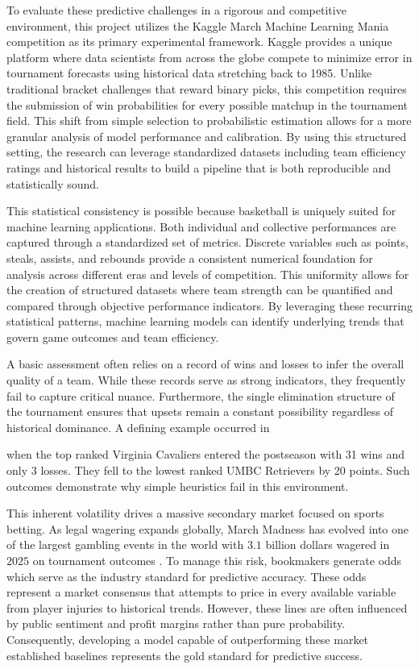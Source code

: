 \documentclass[12pt,leqno]{article}\usepackage[pdftex]{graphicx}\usepackage[usenames,dvipsnames]{xcolor}
\theoremstyle{remark}
\begin{document}
To evaluate these predictive challenges in a rigorous and competitive environment, this project utilizes the Kaggle March Machine Learning Mania competition as its primary experimental framework. Kaggle provides a unique platform where data scientists from across the globe compete to minimize error in tournament forecasts using historical data stretching back to 1985. Unlike traditional bracket challenges that reward binary picks, this competition requires the submission of win probabilities for every possible matchup in the tournament field. This shift from simple selection to probabilistic estimation allows for a more granular analysis of model performance and calibration. By using this structured setting, the research can leverage standardized datasets including team efficiency ratings and historical results to build a pipeline that is both reproducible and statistically sound.

This statistical consistency is possible because basketball is uniquely suited for machine learning applications. Both individual and collective performances are captured through a standardized set of metrics. Discrete variables such as points, steals, assists, and rebounds provide a consistent numerical foundation for analysis across different eras and levels of competition. This uniformity allows for the creation of structured datasets where team strength can be quantified and compared through objective performance indicators. By leveraging these recurring statistical patterns, machine learning models can identify underlying trends that govern game outcomes and team efficiency.

A basic assessment often relies on a record of wins and losses to infer the overall quality of a team. While these records serve as strong indicators, they frequently fail to capture critical nuance. Furthermore, the single elimination structure of the tournament ensures that upsets remain a constant possibility regardless of historical dominance. A defining example occurred in \date{2018} when the top ranked Virginia Cavaliers entered the postseason with 31 wins and only 3 losses. They fell to the lowest ranked UMBC Retrievers by 20 points. Such outcomes demonstrate why simple heuristics fail in this environment. 

This inherent volatility drives a massive secondary market focused on sports betting. As legal wagering expands globally, March Madness has evolved into one of the largest gambling events in the world with $3.1$ billion dollars wagered in $2025$ on tournament outcomes \cite{AGA2025}. To manage this risk, bookmakers generate odds which serve as the industry standard for predictive accuracy. These odds represent a market consensus that attempts to price in every available variable from player injuries to historical trends. However, these lines are often influenced by public sentiment and profit margins rather than pure probability. Consequently, developing a model capable of outperforming these market established baselines represents the gold standard for predictive success.
\end{document}
